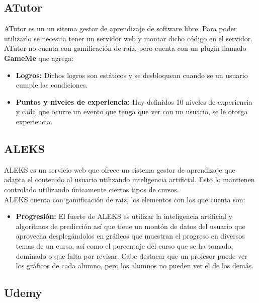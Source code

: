 \begin{multicols}{2}
\subsection*{ATutor}

    ATutor es un un sitema gestor de aprendizaje de software libre. Para poder utilizarlo se necesita tener un servidor web y montar dicho código en el servidor.\\
    
    \noindent ATutor no cuenta con gamificación de raíz, pero cuenta con un plugin llamado \textbf{GameMe} que agrega:
    \begin{itemize}
        \item \textbf{Logros: } Dichos logros son estáticos y se desbloquean cuando se un usuario cumple las condiciones.
        \item \textbf{Puntos y niveles de experiencia: } Hay definidos 10 niveles de experiencia y cada que ocurre un evento que tenga que ver con un usuario, se le otorga experiencia.
    \end{itemize}

\subsection*{ALEKS}

    ALEKS es un servicio web que ofrece un sistema gestor de aprendizaje  que adapta el contenido al usuario utilizando inteligencia artificial. Esto lo mantienen controlado utilizando únicamente ciertos tipos de cursos.\\
    
    \noindent ALEKS cuenta con gamificación de raíz, los elementos con los que cuenta son:
    
    \begin{itemize}
        \item \textbf{Progresión: } El fuerte de ALEKS es utilizar la inteligencia artificial y algoritmos de predicción así que tiene un montón de datos del usuario que aprovecha desplegándolos en gráficos que muestran el progreso en diversos temas de un curso, así como el porcentaje del curso que se ha tomado, dominado o que falta por revisar. Cabe destacar que un profesor puede ver los gráficos de cada alumno, pero los alumnos no pueden ver el de los demás.
    \end{itemize}
\subsection*{Udemy}


\end{multicols}
